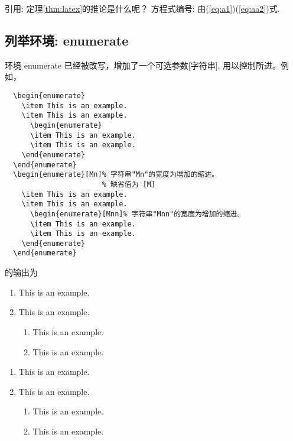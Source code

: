引用:   定理\ref{thm:latex}的推论是什么呢？
方程式编号:  由(\ref{eq:a1})(\ref{eq:aa2})式.

\subsection{列举环境:  enumerate}

环境 enumerate 已经被改写，增加了一个可选参数[字符串], 用以控制所进。例如，
\begin{verbatim}
  \begin{enumerate}
    \item This is an example.
    \item This is an example.
      \begin{enumerate}
      \item This is an example.
      \item This is an example.
    \end{enumerate}
  \end{enumerate}
  \begin{enumerate}[Mn]% 字符串"Mn"的宽度为增加的缩进。
                       % 缺省值为 [M]
    \item This is an example.
    \item This is an example.
      \begin{enumerate}[Mnn]% 字符串"Mnn"的宽度为增加的缩进。
      \item This is an example.
      \item This is an example.
    \end{enumerate}
  \end{enumerate}
\end{verbatim}
的输出为
  \begin{enumerate}
    \item This is an example.
    \item This is an example.
      \begin{enumerate}
      \item This is an example.
      \item This is an example.
    \end{enumerate}
  \end{enumerate}
  \begin{enumerate}[Mn]%
    \item This is an example.
    \item This is an example.
      \begin{enumerate}[Mnn]%
      \item This is an example.
      \item This is an example.
    \end{enumerate}
  \end{enumerate}


